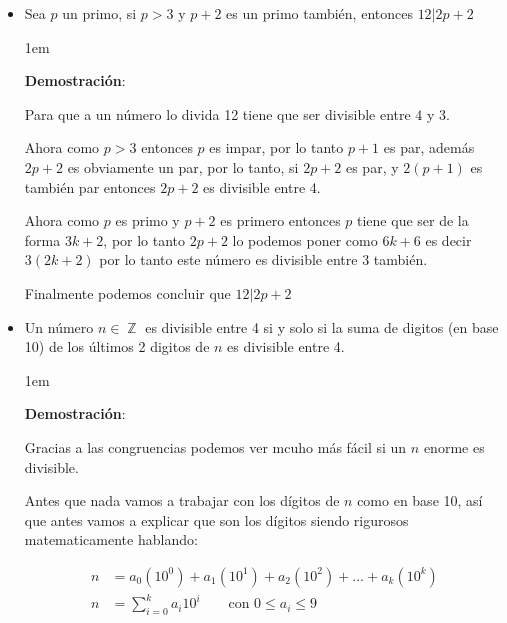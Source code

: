\documentclass[12pt, fleqn]{article}                             %
\newenvironment{SmallIndentation}[1][0.75em]                    %
    {\begin{adjustwidth}{#1}{}\begin{footnotesize}}                 %
    {\end{footnotesize}\end{adjustwidth}}                           %
\DeclareMathOperator \Space {\quad}                             %
\DeclareMathOperator \Integers  {\mathbb{Z}}                     %
\begin{document}
\begin{itemize}
\begin{SmallIndentation}[1em]
                Por lo tanto no puede ser un cuadrado perfecto.

            \end{SmallIndentation}


        \item
            Sea $p$ un primo, si $p > 3$ y $p + 2$ es un primo también, entonces
            $12 | 2p + 2$

            \begin{SmallIndentation}[1em]
                \textbf{Demostración}:

                Para que a un número lo divida 12 tiene que ser divisible entre $4$ y $3$.

                Ahora como $p > 3$ entonces $p$ es impar, por lo tanto $p+1$ es par,
                además $2p + 2$ es obviamente un par, por lo tanto, si $2p+2$ es par, y $2(p+1)$ es también
                par entonces $2p+2$ es divisible entre 4.

                Ahora como $p$ es primo y $p+2$ es primero entonces $p$ tiene que ser de la forma $3k+2$, 
                por lo tanto $2p+2$ lo podemos poner como $6k+6$ es decir $3(2k+2)$ por lo tanto este número 
                es divisible entre 3 también.

                Finalmente podemos concluir que $12 | 2p + 2$

            \end{SmallIndentation}

        \clearpage

        \item

            Un número $n \in \Integers$ es divisible entre 4 si y solo si
            la suma de digitos (en base 10) de los últimos 2 digitos de $n$ es divisible
            entre 4.

            \begin{SmallIndentation}[1em]
                \textbf{Demostración}:

                Gracias a las congruencias podemos ver mcuho más fácil si un $n$ enorme
                es divisible.

                Antes que nada vamos a trabajar con los dígitos de $n$ como en base 10,
                así que antes vamos a explicar que son los dígitos siendo rigurosos matematicamente
                hablando:

                \begin{equation}
                \begin{split}
                    n &= a_0(10^0) + a_1(10^1) + a_2(10^2) + \dots + a_k(10^k)          \\
                    n &= \sum_{i=0}^{k} a_i 10^i \Space \text{ con } 0 \leq a_i \leq 9
                \end{split}
                \end{equation}


\end{SmallIndentation}
\end{itemize}
\end{document}
